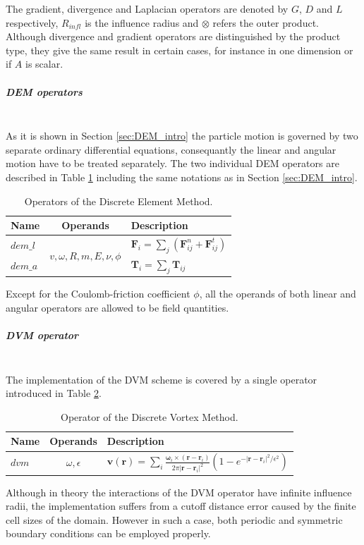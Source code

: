 \documentclass[a4paper,12pt,openany]{book}
\newcommand{\mysubparagraph}[1]{\subparagraph{#1}\mbox{}\\}
\theoremstyle{break}
\begin{document}
The gradient, divergence and Laplacian operators are denoted by $G$, $D$ and $L$ respectively, $R_{infl}$ is the influence radius and $\otimes$ refers the outer product. Although divergence and gradient operators are distinguished by the product type, they give the same result in certain cases, for instance in one dimension or if $A$ is scalar.

\mysubparagraph{DEM operators}
As it is shown in Section \ref{sec:DEM_intro} the particle motion is governed by two separate ordinary differential equations, consequantly the linear and angular motion have to be treated separately. The two individual DEM operators are described in Table \ref{tbl:DEM_ops} including the same notations as in Section \ref{sec:DEM_intro}.
\begin{table} [h!]
\begin{center}
\caption{Operators of the Discrete Element Method.} \label{tbl:DEM_ops}
\begin{tabular}{ l c l }
\toprule[1.5pt]
\bf Name & \bf Operands & \bf Description \\ 
\midrule
$dem\_l$ & \multirow{2}{*}{$v, \omega, R, m, E, \nu, \phi$} & $\textbf{F}_i=\sum_{j}{\left(\textbf{F}^n_{ij}+\textbf{F}^t_{ij}\right)}$ \\ 
$dem\_a$ &  & $\textbf{T}_i=\sum_{j}{\textbf{T}_{ij}}$ \\ 
\bottomrule[1.25pt]
\end{tabular}
\end{center}
\end{table}
Except for the Coulomb-friction coefficient $\phi$, all the operands of both linear and angular operators are allowed to be field quantities.


\mysubparagraph{DVM operator}
The implementation of the DVM scheme is covered by a single operator introduced in Table \ref{tbl:DVM_op}. 
\begin{table} [h!]
\begin{center}
\caption{Operator of the Discrete Vortex Method.} \label{tbl:DVM_op}
\begin{tabular}{ l c l }
\toprule[1.5pt]
\bf Name & \bf Operands & \bf Description \\ 
\midrule
$dvm$ & $\omega, \epsilon$ & $\textbf{v}(\textbf{r})=\sum_i\frac{\bm{\omega}_i\times (\textbf{r}-\textbf{r}_i)}{2\pi \vert\textbf{r}-\textbf{r}_i\vert^2}(1-e^{-\vert\textbf{r}-\textbf{r}_i\vert^2/\epsilon^2})$ \\
\bottomrule[1.25pt]
\end{tabular}
\end{center}
\end{table}
Although in theory the interactions of the DVM operator have infinite influence radii, the implementation suffers from a cutoff distance error caused by the finite cell sizes of the domain. However in such a case, both periodic and symmetric boundary conditions can be employed properly.
\end{document}
